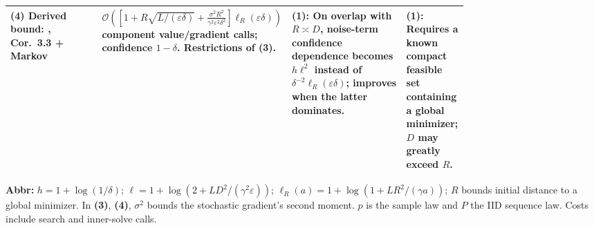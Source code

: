 \begin{table}[tp]
\begin{threeparttable}
\begin{tabularx}{\linewidth}{@{}>{\raggedright\arraybackslash}p{0.20\linewidth}>{\raggedright\arraybackslash}p{0.32\linewidth}>{\raggedright\arraybackslash}p{0.25\linewidth}>{\raggedright\arraybackslash}X@{}}
\midrule
\textbf{(4)} Derived bound: \citep{scqFu2023}, Cor.~3.3 + Markov & $\mathcal{O}\!\left([1+R\sqrt{L/(\varepsilon\delta)}+\frac{\sigma^2R^2}{\gamma^2\varepsilon^2\delta^2}]\ell_R(\varepsilon\delta)\right)$ component value/gradient calls; confidence $1-\delta$. Restrictions of \textbf{(3)}. & \textbf{(1)}: On overlap with $R\asymp D$, noise-term confidence dependence becomes $h\ell^2$ instead of $\delta^{-2}\ell_R(\varepsilon\delta)$; improves when the latter dominates. & \textbf{(1)}: Requires a known compact feasible set containing a global minimizer; $D$ may greatly exceed $R$. \\
\bottomrule
\end{tabularx}
\begin{tablenotes}[flushleft]\footnotesize
\item[] \textbf{Abbr:} $h=1+\log(1/\delta)$; $\ell=1+\log(2+LD^2/(\gamma^2\varepsilon))$; $\ell_R(a)=1+\log(1+LR^2/(\gamma a))$; $R$ bounds initial distance to a global minimizer. In \textbf{(3)}, \textbf{(4)}, $\sigma^2$ bounds the stochastic gradient's second moment. $p$ is the sample law and $P$ the IID sequence law. Costs include search and inner-solve calls.
\end{tablenotes}
\end{threeparttable}
\end{table}
\clearpage

